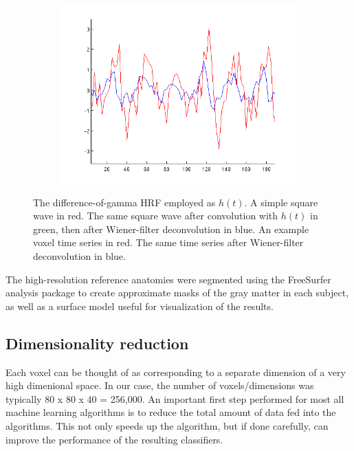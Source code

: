 \documentclass[preprint,5p,authoryear]{elsarticle}
\begin{document}
\begin{figure}
\begin{subfigure}{0.4\textwidth}
\includegraphics[width=\textwidth]{figures/wiener-voxel}
\caption{}
\label{fig:wiener-voxel}
\end{subfigure}
\caption{
 The difference-of-gamma HRF employed as $h(t)$. 
 A simple square wave in red. 
The same square wave after convolution with $h(t)$ in green, then after Wiener-filter deconvolution in blue. 
 An example voxel time series in red. 
The same time series after Wiener-filter deconvolution in blue.}
\label{fig:wiener-deconvolution}
\end{figure}

The high-resolution reference anatomies were segmented using the FreeSurfer analysis package \citep{FreeSurfer} to create approximate masks of the gray matter in each subject, as well as a surface model useful for visualization of the results.

\subsection{Dimensionality reduction}
Each voxel can be thought of as corresponding to a separate dimension of a very high dimenional space.
In our case, the number of voxels/dimensions was typically 80 x 80 x 40 = 256,000.
An important first step performed for most all machine learning algorithms is to reduce the total amount of data fed into the algorithms.
This not only speeds up the algorithm, but if done carefully, can improve the performance of the resulting classifiers.
\end{document}
